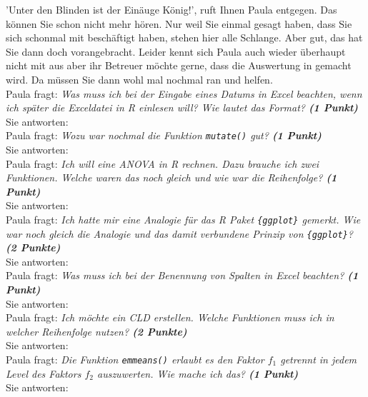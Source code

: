 \documentclass[a4paper, 9pt]{scrartcl}\usepackage[]{graphicx}\usepackage[]{xcolor}
\begin{document}
'Unter den Blinden ist der Einäuge König!', ruft Ihnen Paula entgegen. Das können Sie schon nicht mehr hören. Nur weil Sie einmal gesagt haben, dass Sie sich schonmal mit \Rlogo beschäftigt haben, stehen hier alle Schlange. Aber gut, das hat Sie dann doch vorangebracht. Leider kennt sich Paula auch wieder überhaupt nicht mit \Rlogo aus aber ihr Betreuer möchte gerne, dass die Auswertung in \Rlogo gemacht wird. Da müssen Sie dann wohl mal nochmal ran und helfen.\\[1Ex]

Paula fragt: \textit{Was muss ich bei der Eingabe eines Datums in Excel beachten, wenn ich später die Exceldatei in R einlesen will? Wie lautet das Format? \textbf{(1 Punkt)}}\\[1ex]
Sie antworten:\\[2Ex]

Paula fragt: \textit{Wozu war nochmal die Funktion \texttt{mutate()} gut?  \textbf{(1 Punkt)}}\\[1ex]
Sie antworten:\\[2Ex]

Paula fragt: \textit{Ich will eine ANOVA in R rechnen. Dazu brauche ich zwei Funktionen. Welche waren das noch gleich und wie war die Reihenfolge? \textbf{(1 Punkt)}}\\[1ex]
Sie antworten:\\[2Ex]

Paula fragt: \textit{Ich hatte mir eine Analogie für das R Paket \texttt{\{ggplot\}} gemerkt. Wie war noch gleich die Analogie und das damit verbundene Prinzip von \texttt{\{ggplot\}}? \textbf{(2 Punkte)}}\\[1ex]
Sie antworten:\\[2Ex]

Paula fragt: \textit{Was muss ich bei der Benennung von Spalten in Excel beachten? \textbf{(1 Punkt)}}\\[1ex]
Sie antworten:\\[2Ex]

Paula fragt: \textit{Ich möchte ein CLD erstellen. Welche Funktionen muss ich in welcher Reihenfolge nutzen? \textbf{(2 Punkte)}}\\[1ex]
Sie antworten:\\[2Ex]

Paula fragt: \textit{Die Funktion \texttt{emmeans()} erlaubt es den Faktor $f_1$ getrennt in jedem Level des Faktors $f_2$ auszuwerten. Wie mache ich das? \textbf{(1 Punkt)}}\\[1ex]
Sie antworten:\\[2Ex]
\end{document}
